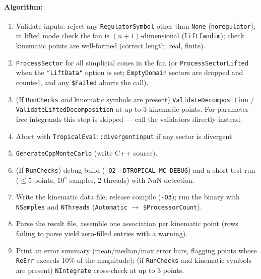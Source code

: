 \documentclass[11pt,a4paper]{article}
\begin{document}
\paragraph{Algorithm:}
\begin{enumerate}
  \item Validate inputs: reject any \texttt{RegulatorSymbol} other than \texttt{None} (\texttt{noregulator}); in lifted mode check the fan is $(n{+}1)$-dimensional (\texttt{liftfandim}); check kinematic points are well-formed (correct length, real, finite).
  \item \texttt{ProcessSector} for all simplicial cones in the fan (or \texttt{ProcessSectorLifted} when the \texttt{"LiftData"} option is set; \texttt{EmptyDomain} sectors are dropped and counted, and any \texttt{\$Failed} aborts the call).
  \item (If \texttt{RunChecks} \emph{and} kinematic symbols are present) \texttt{ValidateDecomposition} / \texttt{ValidateLiftedDecomposition} at up to 3 kinematic points. For parameter-free integrands this step is skipped --- call the validators directly instead.
  \item Abort with \texttt{TropicalEval::divergentinput} if any sector is divergent.
  \item \texttt{GenerateCppMonteCarlo} (write C++ source).
  \item (If \texttt{RunChecks}) debug build (\texttt{-O2 -DTROPICAL\_MC\_DEBUG}) and a short test run ($\leq 5$ points, $10^5$ samples, 2 threads) with NaN detection.
  \item Write the kinematic data file; release compile (\texttt{-O3}); run the binary with \texttt{NSamples} and \texttt{NThreads} (\texttt{Automatic} $\to$ \texttt{\$ProcessorCount}).
  \item Parse the result file, assemble one association per kinematic point (rows failing to parse yield zero-filled entries with a warning).
  \item Print an error summary (mean/median/max error bars, flagging points whose \texttt{ReErr} exceeds 10\% of the magnitude); (if \texttt{RunChecks} and kinematic symbols are present) \texttt{NIntegrate} cross-check at up to 3 points.
\end{enumerate}
\end{document}
